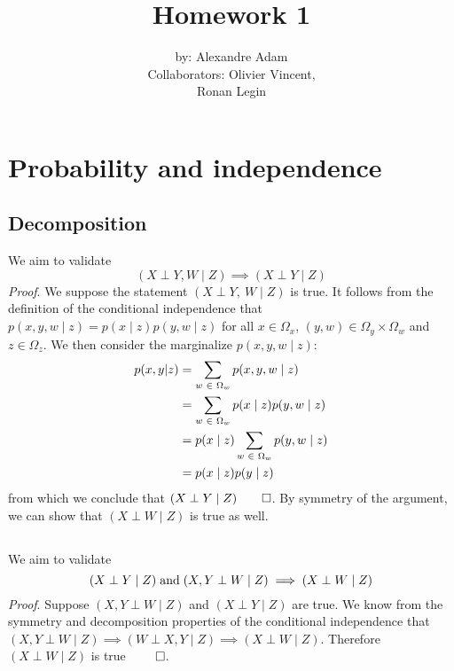 \documentclass{article}
\title{Homework 1}
\author{by: Alexandre Adam \\ Collaborators: Olivier Vincent, \\ Ronan Legin}
\newcommand{\s}{\hspace{0.1cm}}
\numberwithin{equation}{section}
\begin{document}
\maketitle

\section{Probability and independence}
\subsection{Decomposition}
We aim to validate
\begin{equation}
        (X \perp Y, W \mid  Z)  \implies (X \perp Y \mid Z)
\end{equation}
\textit{Proof}.  We suppose the statement $(X \perp Y,\ W \mid Z)$ is true. 
It follows from the definition of the conditional independence that
$p(x, y, w \mid z) = p(x\mid z) p(y, w\mid z)$ for all 
$x \in  \Omega_x$, $(y, w) \in \Omega_y \times  \Omega_w$  and $z \in  \Omega_z$.
We then consider the marginalize  $p(x,y,w \mid z)$:
\begin{align*}
        p(x,y|z) &=  \sum_{w\s \in \s \Omega_w}  p(x, y , w \mid z) \\
                 &=  \sum_{w\s \in \s \Omega_w} p(x\mid z)p(y,w \mid z) \\
                 &= p(x \mid z) \sum_{w\s  \in \s  \Omega_w} p(y,w \mid z) \\
                &=  p(x\mid z) p(y\mid  z)
\end{align*}
from which we conclude that  $(X \perp Y \mid Z) \qed$.
By symmetry of the argument,  we can show that ${(X \perp W \mid Z)}$ is true as well.

\subsection{}
We aim to validate 
\begin{equation}\label{eq:1b}
       (X \perp Y \mid Z) \s \text{and} \s (X, Y \perp  W \mid Z) \implies (X \perp W \mid Z)  
\end{equation}
\textit{Proof}. Suppose $(X, Y \perp  W \mid Z)$ and $(X \perp Y \mid Z)$ are true.
We know from the symmetry and decomposition properties of  
the  conditional independence that  
$(X, Y \perp W \mid  Z)  \implies  (W \perp X, Y \mid Z)  \implies  (X \perp  W \mid Z)$.
Therefore $ (X \perp W \mid Z)$ is true $\qed$.
\end{document}
